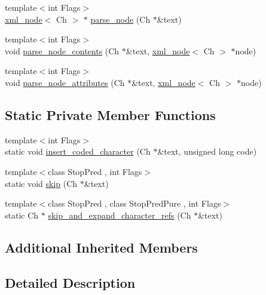 \begin{DoxyCompactItemize}
\item 
{\footnotesize template$<$int Flags$>$ }\\\hyperlink{singletonrapidxml_1_1xml__node}{xml\+\_\+node}$<$ Ch $>$ $\ast$ \hyperlink{singletonrapidxml_1_1xml__document_a5e94cbc9b02e864cb80961ddb8cc63a7}{parse\+\_\+node} (Ch $\ast$\&text)
\item 
{\footnotesize template$<$int Flags$>$ }\\void \hyperlink{singletonrapidxml_1_1xml__document_aae0a4c2e1972ab9a9e0ce91cf1166ac9}{parse\+\_\+node\+\_\+contents} (Ch $\ast$\&text, \hyperlink{singletonrapidxml_1_1xml__node}{xml\+\_\+node}$<$ Ch $>$ $\ast$node)
\item 
{\footnotesize template$<$int Flags$>$ }\\void \hyperlink{singletonrapidxml_1_1xml__document_ac0b3cd07b3d5cbaa83762a196c681519}{parse\+\_\+node\+\_\+attributes} (Ch $\ast$\&text, \hyperlink{singletonrapidxml_1_1xml__node}{xml\+\_\+node}$<$ Ch $>$ $\ast$node)
\end{DoxyCompactItemize}
\subsection*{Static Private Member Functions}
\begin{DoxyCompactItemize}
\item 
{\footnotesize template$<$int Flags$>$ }\\static void \hyperlink{singletonrapidxml_1_1xml__document_ae33040bcfa8e5a29dc6f6f130984a981}{insert\+\_\+coded\+\_\+character} (Ch $\ast$\&text, unsigned long code)
\item 
{\footnotesize template$<$class Stop\+Pred , int Flags$>$ }\\static void \hyperlink{singletonrapidxml_1_1xml__document_a27aca5bdcb3bfa899f61b17d7f1d3a0d}{skip} (Ch $\ast$\&text)
\item 
{\footnotesize template$<$class Stop\+Pred , class Stop\+Pred\+Pure , int Flags$>$ }\\static Ch $\ast$ \hyperlink{singletonrapidxml_1_1xml__document_af86781975cdfff2105fa8c0b49ab4507}{skip\+\_\+and\+\_\+expand\+\_\+character\+\_\+refs} (Ch $\ast$\&text)
\end{DoxyCompactItemize}
\subsection*{Additional Inherited Members}


\subsection{Detailed Description}
